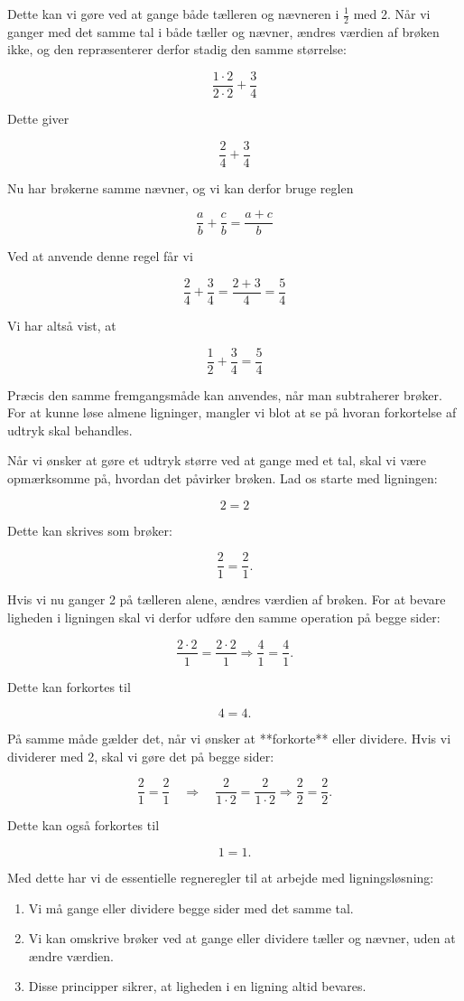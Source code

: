 Dette kan vi gøre ved at gange både tælleren og nævneren i $\frac{1}{2}$ med 2. Når vi ganger med det samme tal i både tæller og nævner, ændres værdien af brøken ikke, og den repræsenterer derfor stadig den samme størrelse:

\[
\frac{1\cdot2}{2\cdot2} + \frac{3}{4}
\]

Dette giver

\[
\frac{2}{4} + \frac{3}{4}
\]

Nu har brøkerne samme nævner, og vi kan derfor bruge reglen

\[
\frac{a}{b} + \frac{c}{b} = \frac{a+c}{b}
\]

Ved at anvende denne regel får vi

\[
\frac{2}{4} + \frac{3}{4} = \frac{2+3}{4} = \frac{5}{4}
\]

Vi har altså vist, at

\[
\frac{1}{2} + \frac{3}{4} = \frac{5}{4}
\]

Præcis den samme fremgangsmåde kan anvendes, når man subtraherer brøker. For at kunne løse almene ligninger, mangler vi blot at se på hvoran forkortelse af udtryk skal behandles.

Når vi ønsker at gøre et udtryk større ved at gange med et tal, skal vi være opmærksomme på, hvordan det påvirker brøken. Lad os starte med ligningen:

\[
2 = 2
\]

Dette kan skrives som brøker:

\[
\frac{2}{1} = \frac{2}{1}.
\]

Hvis vi nu ganger 2 på tælleren alene, ændres værdien af brøken. For at bevare ligheden i ligningen skal vi derfor udføre den samme operation på begge sider:

\[
\frac{2\cdot2}{1} = \frac{2\cdot2}{1} \Rightarrow \frac{4}{1} = \frac{4}{1}.
\]

Dette kan forkortes til

\[
4 = 4.
\]

På samme måde gælder det, når vi ønsker at **forkorte** eller dividere. Hvis vi dividerer med 2, skal vi gøre det på begge sider:

\[
\frac{2}{1} = \frac{2}{1} \quad \Rightarrow \quad \frac{2}{1\cdot2} = \frac{2}{1\cdot2} \Rightarrow \frac{2}{2} = \frac{2}{2}.
\]

Dette kan også forkortes til

\[
1 = 1.
\]

Med dette har vi de essentielle regneregler til at arbejde med ligningsløsning:  
\begin{enumerate}
    \item Vi må gange eller dividere begge sider med det samme tal.  
    \item Vi kan omskrive brøker ved at gange eller dividere tæller og nævner, uden at ændre værdien.  
    \item Disse principper sikrer, at ligheden i en ligning altid bevares.
\end{enumerate}

